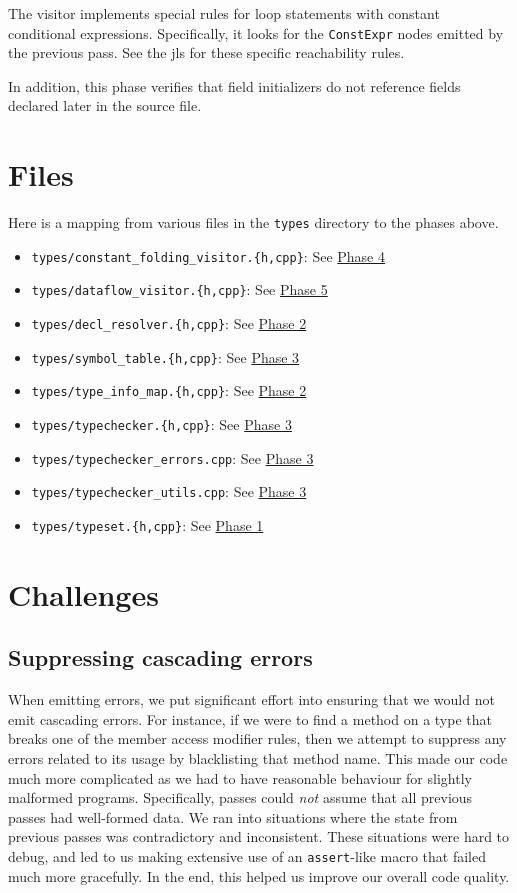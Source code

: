 \documentclass[12pt, titlepage]{article}
\newcommand{\z}[1]{\texttt{#1}}
\begin{document}
The visitor implements special rules for loop statements with constant
conditional expressions. Specifically, it looks for the \z{ConstExpr} nodes
emitted by the previous pass. See the \ac{jls} for these specific reachability
rules.

In addition, this phase verifies that field initializers do not reference
fields declared later in the source file.

\section{Files}

Here is a mapping from various files in the \z{types} directory to the phases
above.

\begin{itemize}
  \item \z{types/constant\_folding\_visitor.\{h,cpp\}}: See \hyperref[subsubsec:const-prop]{Phase 4}
  \item \z{types/dataflow\_visitor.\{h,cpp\}}: See \hyperref[subsubsec:data-flow]{Phase 5}
  \item \z{types/decl\_resolver.\{h,cpp\}}: See \hyperref[subsubsec:fields]{Phase 2}
  \item \z{types/symbol\_table.\{h,cpp\}}: See \hyperref[subsubsec:type-checking]{Phase 3}
  \item \z{types/type\_info\_map.\{h,cpp\}}: See \hyperref[subsubsec:fields]{Phase 2}
  \item \z{types/typechecker.\{h,cpp\}}: See \hyperref[subsubsec:type-checking]{Phase 3}
  \item \z{types/typechecker\_errors.cpp}: See \hyperref[subsubsec:type-checking]{Phase 3}
  \item \z{types/typechecker\_utils.cpp}: See \hyperref[subsubsec:type-checking]{Phase 3}
  \item \z{types/typeset.\{h,cpp\}}: See \hyperref[subsubsec:col-types]{Phase 1}
\end{itemize}

\section{Challenges}

\subsection{Suppressing cascading errors}

When emitting errors, we put significant effort into ensuring that we would not
emit cascading errors. For instance, if we were to find a method on a type
that breaks one of the member access modifier rules, then we attempt to
suppress any errors related to its usage by blacklisting that method name. This
made our code much more complicated as we had to have reasonable behaviour for
slightly malformed programs. Specifically, passes could \emph{not} assume that
all previous passes had well-formed data. We ran into situations where the
state from previous passes was contradictory and inconsistent. These situations
were hard to debug, and led to us making extensive use of an \z{assert}-like
macro that failed much more gracefully. In the end, this helped us improve our
overall code quality.
\end{document}
